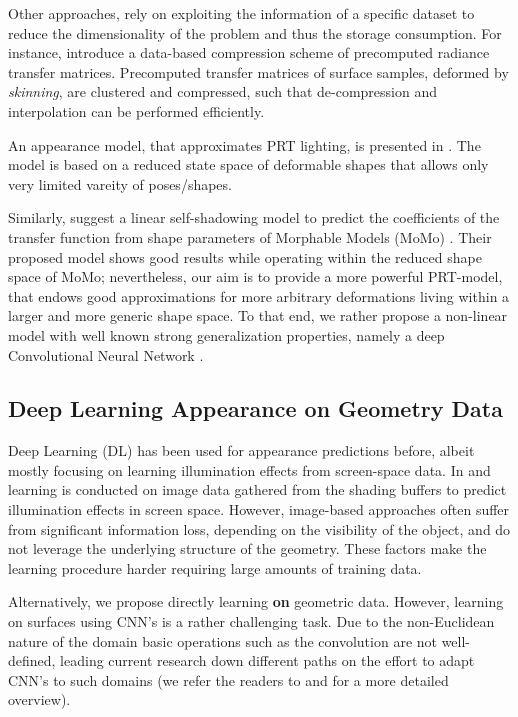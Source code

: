 Other approaches, rely on exploiting the information of a specific dataset to reduce the dimensionality of the problem and thus the storage consumption. For instance, \cite{SkinningPRT} introduce a data-based compression scheme of precomputed radiance transfer matrices. Precomputed transfer matrices of surface samples, deformed by \textit{skinning}, are clustered and compressed, such that de-compression and interpolation can be performed efficiently.

An appearance model, that approximates PRT lighting, is presented in  \cite{James_Fatahalian}. The model is based on a reduced state space of deformable shapes that allows only very limited vareity of poses/shapes. 

Similarly, \cite{MoMoPRT} suggest a linear self-shadowing model to predict the coefficients of the transfer function from shape parameters of Morphable Models (MoMo) \cite{MoMo}. Their proposed model shows good results while operating within the reduced shape space of MoMo; nevertheless, our aim is to provide a more powerful PRT-model, that endows good approximations for more arbitrary deformations living within a larger and more generic shape space. To that end, we rather propose a non-linear model with well known strong generalization properties, namely a deep Convolutional Neural Network \cite{DL_nature, ImageNet_CNN, CNN_videoClassification}.  
\subsection*{Deep Learning Appearance on Geometry Data} 
Deep Learning (DL) has been used for appearance predictions before, albeit mostly focusing on learning illumination effects from screen-space data. In  \cite{Nalbach2017b} and \cite{DBLP} learning is conducted on image data gathered from the shading buffers to predict illumination effects in screen space. However, image-based approaches often suffer from significant information loss, depending on the visibility of the object, and do not leverage the underlying structure of the geometry. These factors make the learning procedure harder requiring large amounts of training data.

Alternatively, we propose directly learning \textbf{on} geometric data.  However, learning on surfaces using CNN's is a rather challenging task. Due to the non-Euclidean nature of the domain basic operations such as the convolution are not well-defined, leading current research down different paths on the effort to adapt CNN's to such domains (we refer the readers to \cite{Geometric_deep_learning} and \cite{DeepGeoCourse} for a more detailed overview).

